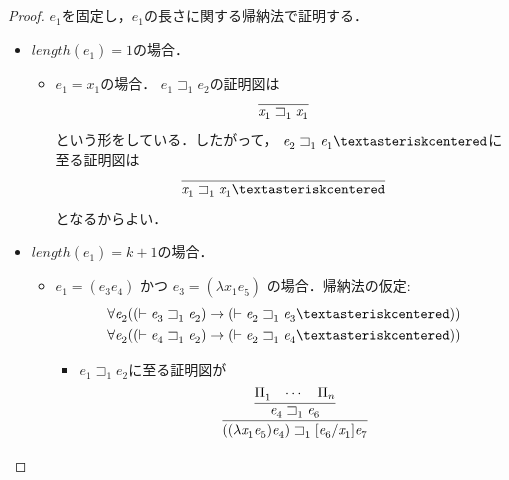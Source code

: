 \documentclass{ltjsbook}%
\begin{document}
\begin{proof}%
  $\mathit{e}_1^{}$を固定し，$\mathit{e}_1^{}$の長さに関する帰納法で証明する．%
  \begin{itemize}%
  \item $length(\mathit{e}_1^{})=1$の場合．%
    \begin{itemize}%
    \item $\mathit{e}_1^{}=\mathit{x}_1^{}$の場合．%
      $\mathit{e}_1^{}\sqsupset_1^{}\mathit{e}_2^{}$の証明図は%
      \begin{equation}%
        \infer{%
          \mathit{x}_1^{}\sqsupset_1^{}\mathit{x}_1^{}%
        }{%
        }%
      \end{equation}%
      という形をしている．したがって，%
      $\mathit{e}_2^{}\sqsupset_1^{}\mathit{e}_1^{}\textasteriskcentered$に至る証明図は%
      \begin{equation}%
        \infer{%
          \mathit{x}_1^{}\sqsupset_1^{}\mathit{x}_1^{}\textasteriskcentered%
        }{%
        }%
      \end{equation}%
      となるからよい．%
    \end{itemize}%
  \item $length(\mathit{e}_1^{})=k + 1$の場合．%
    \begin{itemize}%
    \item $\mathit{e}_1^{}=(\mathit{e}_3^{}\mathit{e}_4^{})$ かつ%
      $\mathit{e}_3^{}=(\lambda \mathit{x}_1^{}\mathit{e}_5^{})$ の場合．帰納法の仮定:%
      \begin{align}%
        \forall\mathit{e}_2^{}((\vdash\mathit{e}_3^{}\sqsupset_1^{}\mathit{e}_2^{})\rightarrow%
        (\vdash\mathit{e}_2^{}\sqsupset_1^{}\mathit{e}_3^{}\textasteriskcentered))\\%
        \forall\mathit{e}_2^{}((\vdash\mathit{e}_4^{}\sqsupset_1^{}\mathit{e}_2^{})\rightarrow%
        (\vdash\mathit{e}_2^{}\sqsupset_1^{}\mathit{e}_4^{}\textasteriskcentered))%
      \end{align}%
      \begin{itemize}%
      \item $\mathit{e}_1^{}\sqsupset_1^{}\mathit{e}_2^{}$に至る証明図が%
        \begin{equation}%
          \infer{%
            ((\lambda\mathit{x}_1^{}\mathit{e}_5^{})\mathit{e}_4^{})\sqsupset_1^{}%
            [\mathit{e}_6^{}/\mathit{x}_1^{}]\mathit{e}_7^{}%
          }{%
            \infer{%
              \mathit{e}_4^{}\sqsupset_1^{}\mathit{e}_6^{}%
            }{%
              \Pi_1^{}&\cdots&\Pi_n%
            }%
}
\end{equation}
\end{itemize}
\end{itemize}
\end{itemize}
\end{proof}
\end{document}
